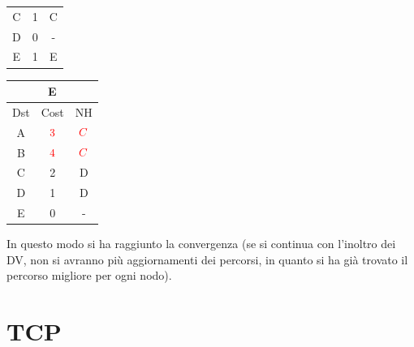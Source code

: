 \documentclass[10pt]{article}
\begin{document}
\begin{table}[h!]
\begin{tabular}{|c||c||c|}
 			C & 1 & C \\
 			D & 0 & - \\
 			E & 1 & E \\
 			\hline
		\end{tabular}
		\begin{tabular}{|c||c||c|}
 			\hline
	 		\multicolumn{3}{|c|}{E} \\
 			\hline
 			Dst & Cost & NH\\
 			\hline
 			A & $\color{red} 3$ & $\color{red} C$ \\
 			B & $\color{red} 4$ & $\color{red} C$ \\
 			C & 2 & D \\
 			D & 1 & D \\
 			E & 0 & - \\
 			\hline
		\end{tabular}
	\end{table}
	\newline \newline
	In questo modo si ha raggiunto la convergenza (se si continua con l'inoltro dei DV, non si avranno più aggiornamenti dei percorsi, in quanto si ha già trovato il percorso migliore per ogni nodo).
\newpage
\section{TCP}
\end{document}

